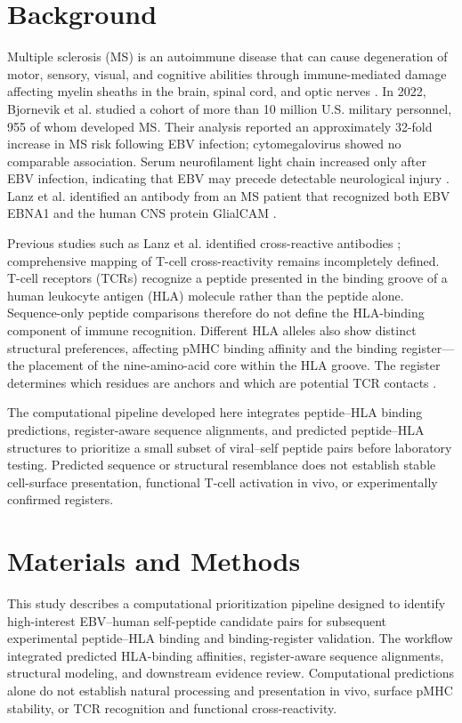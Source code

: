 \documentclass[11pt]{article}
\begin{document}
\section{Background}
Multiple sclerosis (MS) is an autoimmune disease that can cause degeneration of motor, sensory, visual, and cognitive abilities through immune-mediated damage affecting myelin sheaths in the brain, spinal cord, and optic nerves \cite{ninds}. In 2022, Bjornevik et al. studied a cohort of more than 10 million U.S. military personnel, 955 of whom developed MS. Their analysis reported an approximately 32-fold increase in MS risk following EBV infection; cytomegalovirus showed no comparable association. Serum neurofilament light chain increased only after EBV infection, indicating that EBV may precede detectable neurological injury \cite{bjornevik}. Lanz et al. identified an antibody from an MS patient that recognized both EBV EBNA1 and the human CNS protein GlialCAM \cite{lanz}.

Previous studies such as Lanz et al. identified cross-reactive antibodies \cite{lanz}; comprehensive mapping of T-cell cross-reactivity remains incompletely defined. T-cell receptors (TCRs) recognize a peptide presented in the binding groove of a human leukocyte antigen (HLA) molecule rather than the peptide alone. Sequence-only peptide comparisons therefore do not define the HLA-binding component of immune recognition. Different HLA alleles also show distinct structural preferences, affecting pMHC binding affinity and the binding register---the placement of the nine-amino-acid core within the HLA groove. The register determines which residues are anchors and which are potential TCR contacts \cite{brown,sewell}.

The computational pipeline developed here integrates peptide--HLA binding predictions, register-aware sequence alignments, and predicted peptide--HLA structures to prioritize a small subset of viral--self peptide pairs before laboratory testing. Predicted sequence or structural resemblance does not establish stable cell-surface presentation, functional T-cell activation in vivo, or experimentally confirmed registers.

\section{Materials and Methods}
This study describes a computational prioritization pipeline designed to identify high-interest EBV--human self-peptide candidate pairs for subsequent experimental peptide--HLA binding and binding-register validation. The workflow integrated predicted HLA-binding affinities, register-aware sequence alignments, structural modeling, and downstream evidence review. Computational predictions alone do not establish natural processing and presentation in vivo, surface pMHC stability, or TCR recognition and functional cross-reactivity.
\end{document}
